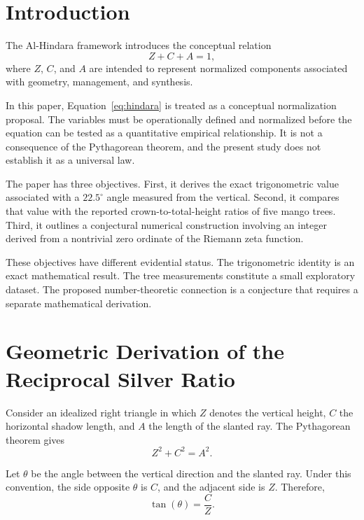 \documentclass[11pt,a4paper]{article}
\begin{document}
\section{Introduction}

The Al-Hindara framework introduces the conceptual relation
\begin{equation}
    Z+C+A=1,
    \label{eq:hindara}
\end{equation}
where \(Z\), \(C\), and \(A\) are intended to represent normalized
components associated with geometry, management, and synthesis.

In this paper, Equation~\eqref{eq:hindara} is treated as a
conceptual normalization proposal. The variables must be
operationally defined and normalized before the equation can be
tested as a quantitative empirical relationship. It is not a
consequence of the Pythagorean theorem, and the present study
does not establish it as a universal law.

The paper has three objectives. First, it derives the exact
trigonometric value associated with a \(22.5^\circ\) angle measured
from the vertical. Second, it compares that value with the
reported crown-to-total-height ratios of five mango trees.
Third, it outlines a conjectural numerical construction involving
an integer derived from a nontrivial zero ordinate of the
Riemann zeta function.

These objectives have different evidential status. The
trigonometric identity is an exact mathematical result. The
tree measurements constitute a small exploratory dataset.
The proposed number-theoretic connection is a conjecture
that requires a separate mathematical derivation.

\section{Geometric Derivation of the Reciprocal Silver Ratio}

Consider an idealized right triangle in which \(Z\) denotes the
vertical height, \(C\) the horizontal shadow length, and \(A\) the
length of the slanted ray. The Pythagorean theorem gives
\begin{equation}
    Z^2+C^2=A^2.
    \label{eq:pythagoras}
\end{equation}

Let \(\theta\) be the angle between the vertical direction and
the slanted ray. Under this convention, the side opposite
\(\theta\) is \(C\), and the adjacent side is \(Z\). Therefore,
\begin{equation}
    \tan(\theta)=\frac{C}{Z}.
    \label{eq:shadow_ratio}
\end{equation}
\end{document}
